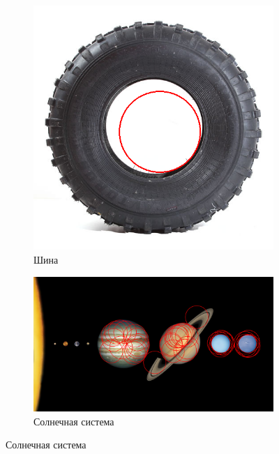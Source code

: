 \documentclass[a4paper, 16pt]{article}
\begin{document}
    \newpage
    \begin{figure}[htbp]
        \centering
        \begin{subfigure}{0.3\textwidth}
            \centering
            \includegraphics[scale=0.15]{canny_hc_r=90_ci1.png}
            \caption{Шина}
            \label{fig:canny_hc_r90_ci1}
        \end{subfigure}
        \hfill
        \begin{subfigure}{0.3\textwidth}
            \centering
            \includegraphics[width=\linewidth]{canny_hc_r=90_ci2.png}
            \caption{Солнечная система}
            \label{fig:canny_hc_r90_ci2}

\end{subfigure}
\end{figure}
\end{document}
